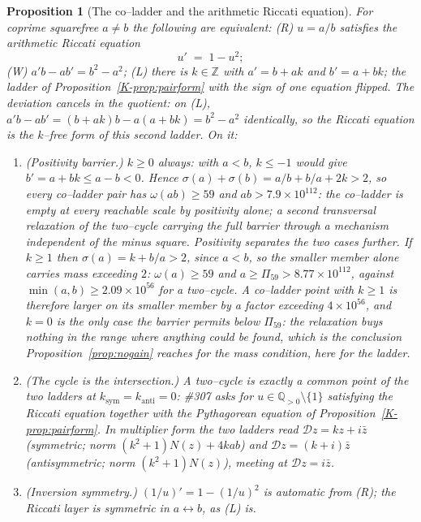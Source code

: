 \documentclass[11pt]{article}
\newtheorem{proposition}[theorem]{Proposition}
\theoremstyle{definition}
\begin{document}
\begin{proposition}[The co--ladder and the arithmetic Riccati equation]\label{prop:coladder}
For coprime squarefree $a\neq b$ the following are equivalent:
\textup{(R)} $u=a/b$ satisfies the arithmetic Riccati equation
\[ u'\;=\;1-u^2; \]
\textup{(W)} $a'b-ab'=b^2-a^2$; \textup{(L)} there is $k\in\mathbb{Z}$ with $a'=b+ak$ \emph{and}
$b'=a+bk$; the ladder of Proposition~\ref{K-prop:pairform} with the sign of one equation flipped.
The deviation cancels in the quotient: on \textup{(L)}, $a'b-ab'=(b+ak)b-a(a+bk)=b^2-a^2$
identically, so the Riccati equation is the $k$--free form of this \emph{second} ladder. On it:
\begin{enumerate}[label=\textup{(\roman*)},leftmargin=2.2em]
\item \emph{(Positivity barrier.)} $k\ge0$ always: with $a<b$, $k\le-1$ would give
$b'=a+bk\le a-b<0$. Hence $\sigma(a)+\sigma(b)=a/b+b/a+2k>2$, so every co--ladder pair has
$\omega(ab)\ge59$ and $ab>7.9\times10^{112}$: the co--ladder is empty at every reachable scale
\emph{by positivity alone}; a second transversal relaxation of the two--cycle carrying the full
barrier through a mechanism independent of the minus square. Positivity separates the two cases
further. If $k\ge1$ then $\sigma(a)=k+b/a>2$, since $a<b$, so the \emph{smaller} member alone
carries mass exceeding $2$: $\omega(a)\ge59$ and $a\ge\Pi_{59}>8.77\times10^{112}$, against
$\min(a,b)\ge2.09\times10^{56}$ for a two--cycle. A co--ladder point with $k\ge1$ is therefore
larger on its smaller member by a factor exceeding $4\times10^{56}$, and $k=0$ is the only case the
barrier permits below $\Pi_{59}$: the relaxation buys nothing in the range where anything could be
found, which is the conclusion Proposition~\ref{prop:nogain} reaches for the mass condition, here
for the ladder.
\item \emph{(The cycle is the intersection.)} A two--cycle is exactly a common point of the two
ladders at $k_{\mathrm{sym}}=k_{\mathrm{anti}}=0$: \#307 asks for $u\in\mathbb{Q}_{>0}\setminus\{1\}$
satisfying the Riccati equation together with the Pythagorean equation of
Proposition~\ref{K-prop:pairform}. In multiplier form the two ladders read
$\mathcal{D}z=kz+i\bar z$ (symmetric; norm $(k^2+1)N(z)+4kab$) and $\mathcal{D}z=(k+i)\bar z$
(antisymmetric; norm $(k^2+1)N(z)$), meeting at $\mathcal{D}z=i\bar z$.
\item \emph{(Inversion symmetry.)} $(1/u)'=1-(1/u)^2$ is automatic from \textup{(R)}; the
Riccati layer is symmetric in $a\leftrightarrow b$, as \textup{(L)} is.
\end{enumerate}
\end{proposition}
\end{document}
